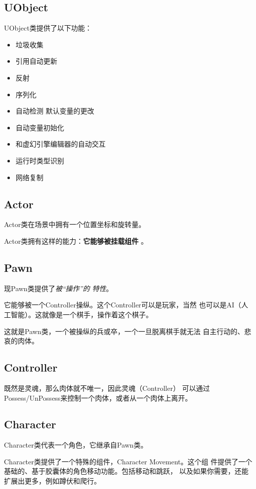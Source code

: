 \documentclass[UTF8,a4paper,12pt]{ctexbook}
\begin{document}
		\subsection{UObject}
			UObject类提供了以下功能：
			\begin{itemize}
				\item 垃圾收集
				\item 引用自动更新
				\item 反射
				\item 序列化
				\item 自动检测 默认变量的更改
				\item 自动变量初始化
				\item 和虚幻引擎编辑器的自动交互
				\item 运行时类型识别
				\item 网络复制
			\end{itemize}
		
		\subsection{Actor}
			Actor类在场景中拥有一个位置坐标和旋转量。
			
			Actor类拥有这样的能力：\textbf{它能够被挂载组件} 。
			
			
		\subsection{Pawn}
			现Pawn类提供了\textit{被“操作”的 特性}。
			
			它能够被一个Controller操纵。这个Controller可以是玩家，当然 也可以是AI（人工智能）。这就像是一个棋手，操作着这个棋子。
			
			这就是Pawn类，一个被操纵的兵或卒，一个一旦脱离棋手就无法 自主行动的、悲哀的肉体。
			
		\subsection{Controller}
			既然是灵魂，那么肉体就不唯一，因此灵魂（Controller） 可以通过 Possess/UnPossess来控制一个肉体，或者从一个肉体上离开。
		
		\subsection{Character}
			Character类代表一个角色，它继承自Pawn类。
			
			Character类提供了一个特殊的组件，Character Movement。这个组 件提供了一个基础的、基于胶囊体的角色移动功能。包括移动和跳跃， 以及如果你需要，还能扩展出更多，例如蹲伏和爬行。
\end{document}
